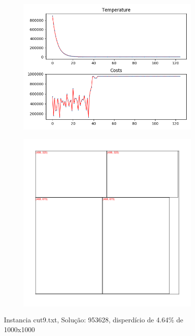 \begin{figure}
\centering
\begin{subfigure}{.5\textwidth}
  \centering
  \includegraphics[width=1\linewidth]{results/cut9/2/plot}
  \label{fig:sub1}
\end{subfigure}%
\begin{subfigure}{.5\textwidth}
  \centering
  \includegraphics[width=1\linewidth]{results/cut9/2/cut}
  \label{fig:sub2}
\end{subfigure}
\caption{Instancia cut9.txt, Solução: 953628, disperdício de 4.64\% de 1000x1000}
\label{fig:test}
\end{figure}


